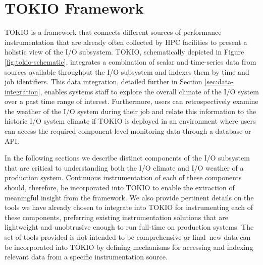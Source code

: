 \section{TOKIO Framework} \label{sec:methods}

TOKIO is a framework that connects different sources of performance instrumentation that are already often collected by HPC facilities to present a holistic view of the I/O subsystem.
TOKIO, schematically depicted in Figure \ref{fig:tokio-schematic}, integrates a combination of scalar and time-series data from sources available throughout the I/O subsystem and indexes them by time and job identifiers.
This data integration, detailed further in Section \ref{sec:data-integration}, enables systems staff to explore the overall climate of the I/O system over a past time range of interest.
Furthermore, users can retrospectively examine the weather of the I/O system during their job and relate this information to the historic I/O system climate if TOKIO is deployed in an environment where users can access the required component-level monitoring data through a database or API.

In the following sections we describe distinct components of the I/O subsystem that are critical to understanding both the I/O climate and I/O weather of a production system.
Continuous instrumentation of each of these components should, therefore, be incorporated into TOKIO to enable the extraction of meaningful insight from the framework.
We also provide pertinent details on the tools we have already chosen to integrate into TOKIO for instrumenting each of these components, preferring existing instrumentation solutions that are lightweight and unobtrusive enough to run full-time on production systems.
The set of tools provided is not intended to be comprehensive or final--new data can be incorporated into TOKIO by defining mechanisms for accessing and indexing relevant data from a specific instrumentation source.

